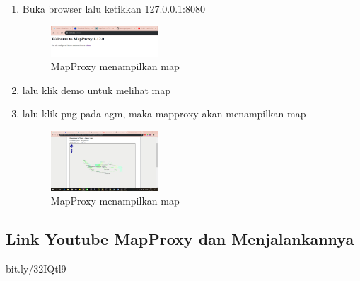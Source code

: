 \begin{enumerate}
  \item Buka browser lalu ketikkan 127.0.0.1:8080
  \hfill\break
  \begin{figure}[H]
  \includegraphics[width=4cm]{figures/tugas4/1174073/24.png}
  \centering
  \caption{MapProxy menampilkan map}
  \end{figure}

  \item lalu klik demo untuk melihat map
  \item lalu klik png pada agm, maka mapproxy akan menampilkan map
  \hfill\break
  \begin{figure}[H]
  \includegraphics[width=4cm]{figures/tugas4/1174073/25.png}
  \centering
  \caption{MapProxy menampilkan map}
  \end{figure}

\end{enumerate}

\subsection{Link Youtube MapProxy dan Menjalankannya}
bit.ly/32IQtl9
